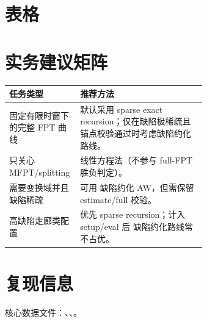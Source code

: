 \documentclass[11pt]{ctexart}
\begin{document}
\section{表格}
\begin{table}[H]
\centering
\small
\caption{按缺陷分箱与时窗分组的运行比摘要。}
\resizebox{\linewidth}{!}{}
\end{table}
\begin{table}[H]
\centering
\small
\caption{锚点配置运行时基线。}
\resizebox{\linewidth}{!}{}
\end{table}
\section{实务建议矩阵}
\begin{table}[H]
\centering
\small
\begin{tabular}{@{}lp{0.64\linewidth}@{}}
\toprule
任务类型 & 推荐方法 \\
\midrule
固定有限时窗下的完整 FPT 曲线 & 默认采用 sparse exact recursion；仅在缺陷极稀疏且锚点校验通过时考虑缺陷约化路线。 \\
只关心 MFPT/splitting & 线性方程法（不参与 full-FPT 胜负判定）。 \\
需要变换域并且缺陷稀疏 & 可用 缺陷约化 AW，但需保留 estimate/full 校验。 \\
高缺陷走廊类配置 & 优先 sparse recursion；计入 setup/eval 后 缺陷约化路线常不占优。 \\
\bottomrule
\end{tabular}
\end{table}
\section{复现信息}
核心数据文件：、、。
\end{document}
